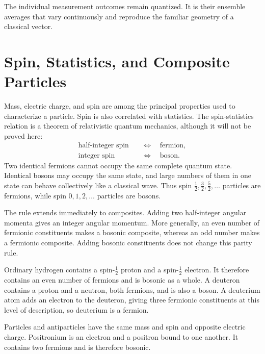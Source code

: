 The individual measurement outcomes remain quantized. It is their ensemble averages that vary continuously and reproduce the familiar geometry of a classical vector.

\section{Spin, Statistics, and Composite Particles}

Mass, electric charge, and spin are among the principal properties used to characterize a particle. Spin is also correlated with statistics. The spin-statistics relation is a theorem of relativistic quantum mechanics, although it will not be proved here:
\begin{equation}
\begin{aligned}
\text{half-integer spin} &\quad\Longleftrightarrow\quad \text{fermion},\\
\text{integer spin} &\quad\Longleftrightarrow\quad \text{boson}.
\end{aligned}
\end{equation}
Two identical fermions cannot occupy the same complete quantum state. Identical bosons may occupy the same state, and large numbers of them in one state can behave collectively like a classical wave. Thus spin \(\tfrac12,\tfrac32,\tfrac52,\ldots\) particles are fermions, while spin \(0,1,2,\ldots\) particles are bosons.

The rule extends immediately to composites. Adding two half-integer angular momenta gives an integer angular momentum. More generally, an even number of fermionic constituents makes a bosonic composite, whereas an odd number makes a fermionic composite. Adding bosonic constituents does not change this parity rule.

Ordinary hydrogen contains a spin-\(\tfrac12\) proton and a spin-\(\tfrac12\) electron. It therefore contains an even number of fermions and is bosonic as a whole. A deuteron contains a proton and a neutron, both fermions, and is also a boson. A deuterium atom adds an electron to the deuteron, giving three fermionic constituents at this level of description, so deuterium is a fermion.

Particles and antiparticles have the same mass and spin and opposite electric charge. Positronium is an electron and a positron bound to one another. It contains two fermions and is therefore bosonic.

